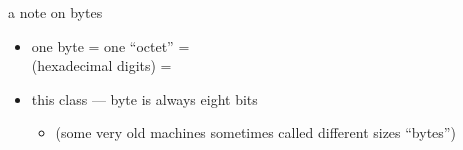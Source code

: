 \begin{frame}{a note on bytes}
    \begin{itemize}
        \item one byte = one ``octet'' = \\
              (hexadecimal digits) = \\
        \vspace{.5cm}
        \item this class --- byte is always eight bits
            \begin{itemize}
                \item (some very old machines sometimes called different sizes ``bytes'')
            \end{itemize}
    \end{itemize}
\end{frame}
